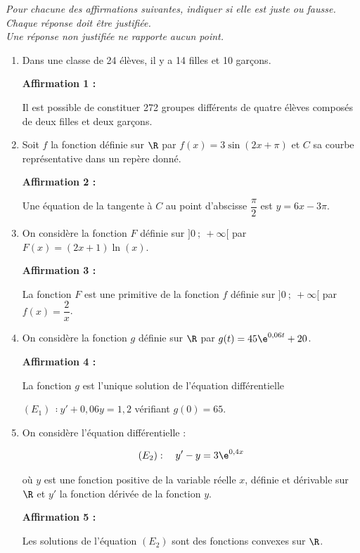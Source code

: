 \medskip

\emph{Pour chacune des affirmations suivantes, indiquer si elle est juste ou fausse.\\ Chaque réponse doit être justifiée.\\ Une réponse non justifiée ne rapporte aucun point.}

\medskip

\begin{enumerate}
\item Dans une classe de 24 élèves, il y a 14 filles et 10 garçons.

\textbf{Affirmation 1 :}

Il est possible de constituer 272 groupes différents de quatre élèves composés de deux filles et deux garçons.
\item Soit $f$ la fonction définie sur $\R$ par $f(x) = 3\sin(2x + \pi)$ et $C$ sa courbe représentative dans un repère donné.

\textbf{Affirmation 2 :}

Une équation de la tangente à $C$ au point d’abscisse $\dfrac{\pi}{2}$ est $y = 6x - 3\pi$.

\item On considère la fonction $F$ définie sur $]0~;~+\infty[$ par $F(x) = (2x + 1)\ln (x)$.

\textbf{Affirmation 3 :}

La fonction $F$ est une primitive de la fonction $f$ définie sur $]0~;~+\infty[$ par $f(x) = \dfrac2x$.
\item On considère la fonction $g$ définie sur $\R$ par $g(t) = 45\e^{0,06t} + 20$.

\textbf{Affirmation 4 :}

La fonction $g$ est l’unique solution de l'équation différentielle

$(E_1)\: ∶ y' + 0,06y = 1,2$ vérifiant $g(0) = 65$.

\item On considère l’équation différentielle :

\[(E_2) :\quad y' - y = 3\e^{0,4x}\]

où $y$ est une fonction positive de la variable réelle $x$, définie et dérivable sur $\R$ et $y'$ la fonction dérivée de la fonction $y$.

\textbf{Affirmation 5 :}

Les solutions de l’équation $(E_2)$ sont des fonctions convexes sur $\R$.
\end{enumerate}

\medskip
